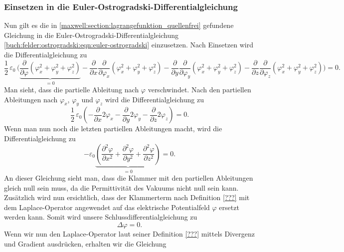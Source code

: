\subsubsection{Einsetzen in die Euler-Ostrogradski-Differentialgleichung}
Nun gilt es die in \eqref{maxwell:section:lagrangefunktion_quellenfrei} gefundene Gleichung in die Euler-Ostrogradski-Differentialgleichung \eqref{buch:felder:ostrogradski:eqn:euler-ostrogradski} einzusetzen.
Nach Einsetzen wird die Differentialgleichung zu
\[
\frac{1}{2}\,\varepsilon_0\,\biggl(\underbrace{\frac{\partial}{\partial\varphi}\left(\varphi_x^2 + \varphi_y^2 + \varphi_z^2\right)}_{\displaystyle=0} - \frac{\partial}{\partial x}\frac{\partial}{\partial \varphi_x}\left(\varphi_x^2 + \varphi_y^2 + \varphi_z^2\right) - 
\frac{\partial}{\partial y}\frac{\partial}{\partial \varphi_y}\left(\varphi_x^2 + \varphi_y^2 + \varphi_z^2\right) - 
\frac{\partial}{\partial z}\frac{\partial}{\partial \varphi_z}\left(\varphi_x^2 + \varphi_y^2 + \varphi_z^2\right)\biggr)
=
0.
\]
Man sieht, dass die partielle Ableitung nach $\varphi$ verschwindet.
Nach den partiellen Ableitungen nach $\varphi_x$, $\varphi_y$ und $\varphi_z$ wird die Differentialgleichung zu
\[
\frac{1}{2}\,\varepsilon_0\left(-\frac{\partial}{\partial x}2\varphi_x - \frac{\partial}{\partial y}2\varphi_y - \frac{\partial}{\partial z}2\varphi_z\right)
=
0.
\]
Wenn man nun noch die letzten partiellen Ableitungen macht, wird die Differentialgleichung zu
\begin{equation}
	- \varepsilon_0\underbrace{\left(\frac{\partial^2\varphi}{\partial x^2} + \frac{\partial^2\varphi}{\partial y^2} + \frac{\partial^2\varphi}{\partial z^2}\right)}_{\displaystyle=0}
	=
	0.
	\label{maxwell:section:laplace_gleichung_1}
\end{equation}
An dieser Gleichung sieht man, dass die Klammer mit den partiellen Ableitungen gleich null sein muss, da die Permittivität des Vakuums nicht null sein kann.
Zusätzlich wird nun ersichtlich, dass der Klammerterm nach Definition \eqref{???} mit dem Laplace-Operator angewendet auf das elektrische Potentialfeld $\varphi$ ersetzt werden kann.
Somit wird unsere Schlussdifferentialgleichung zu
\begin{equation}
	\Delta\varphi
	=
	0.
	\label{maxwell:section:laplace_gleichung_2}
\end{equation}
Wenn wir nun den Laplace-Operator laut seiner Definition \eqref{???} mittels Divergenz und Gradient ausdrücken, erhalten wir die Gleichung

